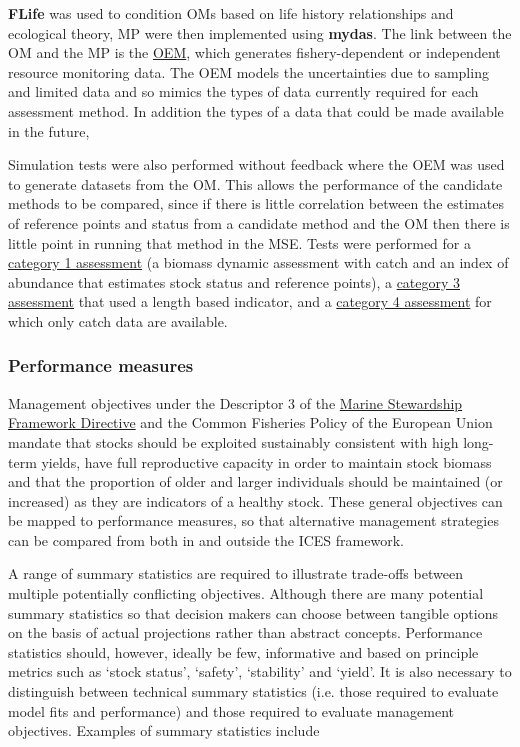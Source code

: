 \textbf{FLife} was used to  condition OMs based on life history relationships and ecological theory, MP were then implemented using \textbf{mydas}. The link between the OM and the MP is the \href{https://3o2y9wugzp1kfxr5hvzgzq-on.drv.tw/MyDas/vignettes/oem.html}{OEM}, which generates fishery-dependent or independent resource monitoring data. The OEM models the uncertainties due to sampling and limited data and so mimics the types of data currently required for each assessment method. In addition the types of a data that could be made available in the future,

Simulation tests were also performed without feedback where the OEM was used to generate datasets from the OM. This allows the performance of the candidate methods to be compared, since if there is little correlation between the estimates of reference points and status from a candidate method and the OM then there is little point in running that method in the MSE. Tests were performed for a 
\href{https://3o2y9wugzp1kfxr5hvzgzq-on.drv.tw/MyDas/tasks/4/R/simtest-bd.pdf}{category 1 assessment} (a biomass dynamic assessment with catch and an index of abundance that estimates stock status and reference points), a \href{https://3o2y9wugzp1kfxr5hvzgzq-on.drv.tw/MyDas/tasks/4/R/simtest-lbspr.pdf}{category 3 assessment} that used a length based indicator, and a \href{https://3o2y9wugzp1kfxr5hvzgzq-on.drv.tw/MyDas/tasks/4/R/simtest-bdsra.pdf}{category 4 assessment} for which only catch data are available.

\subsubsection*{Performance measures} 

Management objectives under the Descriptor 3 of the \href{http://ec.europa.eu/environment/marine/good-environmental-status/descriptor-3/index_en.htm}{Marine Stewardship Framework Directive} and the Common Fisheries Policy of the European Union mandate that stocks should be exploited sustainably consistent with high long-term yields, have full reproductive capacity in order to maintain stock biomass and that the proportion of older and larger individuals should be maintained (or increased) as they are indicators of a healthy stock. These general objectives can be mapped to performance measures, so that alternative management strategies can be compared from both in and outside the ICES framework. %

A range of summary statistics are required to illustrate trade-offs between multiple potentially conflicting objectives. Although there are many potential summary statistics so that decision makers can choose between tangible options on the basis of actual projections rather than abstract concepts. Performance statistics should, however, ideally be few, informative and based on principle metrics such as `stock status’, `safety', `stability' and `yield'. It is also necessary to distinguish between technical summary statistics (i.e. those required to evaluate model fits and performance) and those required to evaluate management objectives. Examples of summary statistics include 


